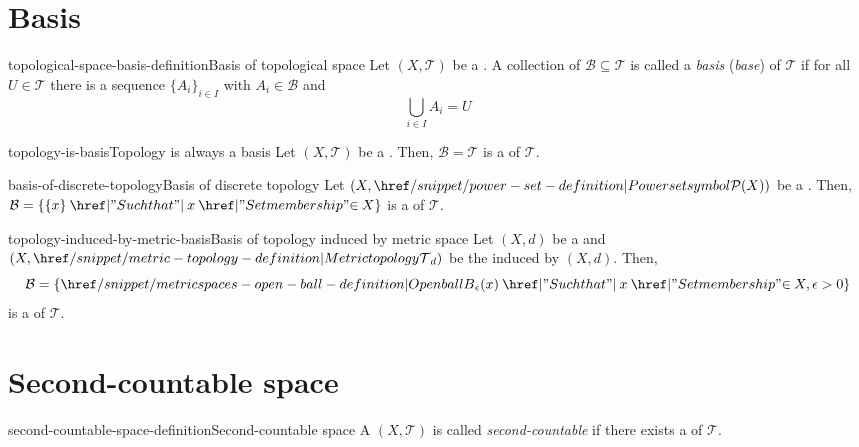 \documentclass[preview]{standalone}
\newcommand\ts{{(X, \mathcal{T})}}
\begin{document}
\genpage

\section{Basis}

\begin{snippetdefinition}{topological-space-basis-definition}{Basis of topological space}
    Let \(\ts\) be a \topologicalspace.
    A collection of  \(\mathcal{B} \subseteq \mathcal{T}\)
    is called a \textit{basis} (\textit{base}) of \(\mathcal{T}\) if for all \(U\in \mathcal{T}\)
    there is a sequence \({\{A_i\}}_{i\in I}\) with \(A_i \in \mathcal{B}\) and
    \[ \bigcup_{i\in I} A_i=U \]
\end{snippetdefinition}

\begin{snippetproposition}{topology-is-basis}{Topology is always a basis}
    Let \(\ts\) be a \topologicalspace.
    Then, \(\mathcal{B} = \mathcal{T}\) is a \topologicalbasis of \(\mathcal{T}\).
\end{snippetproposition}

\begin{snippetproposition}{basis-of-discrete-topology}{Basis of discrete topology}
    Let \((X, \powerset(X))\) be a \topologicalspace.
    Then, \(\mathcal{B} = \left\{\{x\} \suchthat x\in X\right\}\) is a \topologicalbasis of \(\mathcal{T}\).
\end{snippetproposition}

\begin{snippetproposition}{topology-induced-by-metric-basis}{Basis of topology induced by metric space}
    Let \((X,d)\) be a \metricspace and \((X, \metrictopology_d)\)
    be the \topologicalspace induced by \((X,d)\).
    Then, \[\mathcal{B} = \left\{\ball_\epsilon(x) \suchthat x\in X, \epsilon>0\right\}\]
    is a \topologicalbasis of \(\mathcal{T}\).
\end{snippetproposition}

\section{Second-countable space}

\begin{snippetdefinition}{second-countable-space-definition}{Second-countable space}
    A \topologicalspace \(\ts\) is called \textit{second-countable} if there exists a
    \countable \topologicalbasis of \(\mathcal{T}\).
\end{snippetdefinition}
\end{document}
